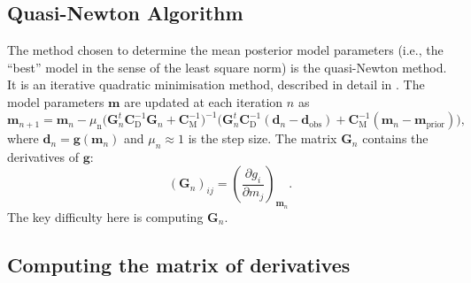 \documentclass{article}
\renewcommand\vec[1]{\mathbf{#1}}
\newcommand\mat[1]{\mathbf{#1}}
\begin{document}
\subsection{Quasi-Newton Algorithm}

The method chosen to determine the mean posterior model parameters (i.e., the ``best'' model in the sense of the least square norm) is the quasi-Newton method. It is an iterative quadratic minimisation method, described in detail in \citet[][p. 78]{tarantola05}. The model parameters $\vec{m}$ are updated at each iteration $n$ as
\begin{equation}
  \vec{m}_{n+1} = \vec{m}_n - \mu_\mathrm{n}\big(\mat{G}^t_n\mat{C}_\mathrm{D}^{-1}\mat{G}_n+\mat{C}_\mathrm{M}^{-1} \big)^{-1}\big(\mat{G}^t_n\mat{C}_\mathrm{D}^{-1}(\vec{d}_n-\vec{d}_\mathrm{obs})+\mat{C}_\mathrm{M}^{-1}(\vec{m}_n-\vec{m}_\mathrm{prior}) \big),
\end{equation}
where
$\vec{d}_n = \vec{g}(\vec{m}_n)$ and $\mu_n \approx 1$ is the step size. The matrix $\mat{G}_n$ contains the derivatives of $\vec{g}$:
\begin{equation} \label{eq:Gn}
  (\mat{G}_n)_{ij} = \left( \frac{\partial g_i}{\partial m_j} \right)_{\vec{m}_n}.
\end{equation}
The key difficulty here is computing $\mat{G}_n$.

\subsection{Computing the matrix of derivatives}
\end{document}
